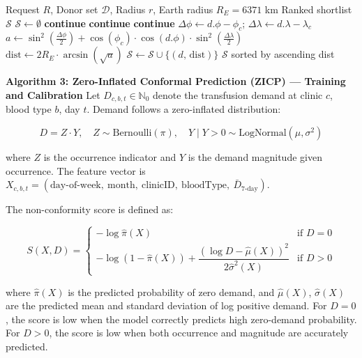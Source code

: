 \documentclass[12pt,a4paper]{article}
\begin{document}
\begin{algorithm}[H]
\caption{Haversine-based Geospatial Matching Algorithm (GMA)}
\begin{algorithmic}[1]
\Require Request $R$, Donor set $\mathcal{D}$, Radius $r$, Earth radius $R_E = 6371$ km
\Ensure Ranked shortlist $\mathcal{S}$
\State $\mathcal{S} \leftarrow \emptyset$
     \textbf{continue} \EndIf
     \textbf{continue} \EndIf
     \textbf{continue} \EndIf
    \State $\Delta\phi \leftarrow d.\phi - \phi_c$; \quad $\Delta\lambda \leftarrow d.\lambda - \lambda_c$
    \State $a \leftarrow \sin^2\!\left(\frac{\Delta\phi}{2}\right) + \cos(\phi_c) \cdot \cos(d.\phi) \cdot \sin^2\!\left(\frac{\Delta\lambda}{2}\right)$
    \State $\text{dist} \leftarrow 2 R_E \cdot \arcsin\!\left(\sqrt{a}\right)$
        \State $\mathcal{S} \leftarrow \mathcal{S} \cup \{(d,\, \text{dist})\}$
    \EndIf
\EndFor
\State \Return $\mathcal{S}$ sorted by ascending dist
\end{algorithmic}
\end{algorithm}

\noindent\textbf{Algorithm 3: Zero-Inflated Conformal Prediction (ZICP) — Training and Calibration}
\noindent Let $D_{c,b,t} \in \mathbb{N}_0$ denote the transfusion demand at clinic $c$, blood type $b$, day $t$. Demand follows a zero-inflated distribution:

\[
D = Z \cdot Y, \quad Z \sim \text{Bernoulli}(\pi), \quad Y \mid Y > 0 \sim \text{LogNormal}(\mu, \sigma^2)
\]

\noindent where $Z$ is the occurrence indicator and $Y$ is the demand magnitude given occurrence. The feature vector is $X_{c,b,t} = (\text{day-of-week},\ \text{month},\ \text{clinicID},\ \text{bloodType},\ \bar{D}_{7\text{-day}})$.

\noindent The non-conformity score is defined as:

\[
S(X, D) = \begin{cases}
-\log \hat{\pi}(X) & \text{if } D = 0 \\
-\log(1 - \hat{\pi}(X)) + \dfrac{(\log D - \hat{\mu}(X))^2}{2\hat{\sigma}^2(X)} & \text{if } D > 0
\end{cases}
\]

\noindent where $\hat{\pi}(X)$ is the predicted probability of zero demand, and $\hat{\mu}(X)$, $\hat{\sigma}(X)$ are the predicted mean and standard deviation of log positive demand. For $D = 0$, the score is low when the model correctly predicts high zero-demand probability. For $D > 0$, the score is low when both occurrence and magnitude are accurately predicted.
\end{document}

